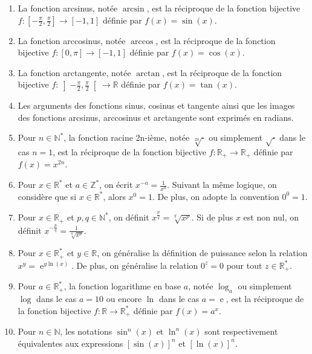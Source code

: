 \documentclass[a4paper,12pt]{article}
\newcommand{\intoo}[1]{\left\rbrack#1\right\lbrack}
\newcommand{\intff}[1]{\left\lbrack#1\right\rbrack}
\DeclareMathOperator{\e}{e}
\begin{document}
\begin{enumerate}
\item La fonction arcsinus, not\'ee $\arcsin$, est la r\' eciproque de la  fonction bijective $f:\intff{-\frac{\pi}{2},\frac{\pi}{2}}\rightarrow\intff{-1,1}$ d\'efinie par $f(x)=\sin(x)$.
\item La fonction arccosinus, not\'ee $\arccos$, est la r\' eciproque de la fonction bijective $f:\intff{0,\pi}\rightarrow\intff{-1,1}$ d\'efinie par $f(x)=\cos(x)$.
\item La fonction arctangente, not\'ee $\arctan$, est la r\' eciproque de la fonction bijective $f:\intoo{-\frac{\pi}{2},\frac{\pi}{2}}\rightarrow\mathbb{R}$ d\'efinie par $f(x)=\tan(x)$.
\item Les arguments des fonctions sinus, cosinus et tangente ainsi que les images des fonctions arcsinus, arccosinus et arctangente sont exprim\'es en radians.
\item Pour $n\in\mathbb{N^*}$, la fonction racine 2n-i\`eme, not\'ee $\sqrt[2n]{\cdot}$ ou simplement $\sqrt{\cdot}$ dans le cas $n=1$, est la r\' eciproque de la fonction bijective $f:\mathbb{R_+}\rightarrow\mathbb{R_+}$ d\'efinie par $f(x)=x^{2n}$.
\item Pour  $x\in\mathbb{R^*}$ et $a\in\mathbb{Z^*}$, on \'ecrit $x^{-a}=\frac{1}{x^a}$. Suivant la m\^eme logique, on consid\`ere que si $x\in\mathbb{R^*}$, alors $x^0=1$. De plus, on adopte la convention $0^0=1$.
\item Pour $x\in\mathbb{R_+}$ et $p,q\in\mathbb{N^*}$, on d\'efinit $x^{\frac{p}{q}}=\sqrt[q]{x^p}$. Si de plus $x$ est non nul, on d\'efinit $x^{-\frac{p}{q}}=\frac{1}{\sqrt[q]{x^p}}$.
\item Pour $x\in\mathbb{R_+^*}$ et $y\in\mathbb{R}$, on g\'en\'eralise la d\'efinition de puissance selon la relation $x^y=\e^{y\ln(x)}$. De plus, on g\'en\'eralise la relation $0^z=0$ pour tout $z\in\mathbb{R_+^*}$.
\item Pour $a\in\mathbb{R_+^*}$, la fonction logarithme en base $a$, not\'ee $\log_a$ ou simplement $\log$ dans le cas $a=10$ ou encore $\ln$ dans le cas $a=\e$, est la r\' eciproque de la fonction bijective $f:\mathbb{R}\rightarrow\mathbb{R_+^*}$ d\'efinie par $f(x)=a^x$.
\item Pour $n\in\mathbb{N}$, les notations $\sin^n(x)$ et $\ln^n(x)$ sont respectivement \'equivalentes aux expressions $\left\lbrack\sin(x)\right\rbrack^n$ et $\left\lbrack\ln(x)\right\rbrack^n$.

\end{enumerate}
\clearpage
\end{document}
